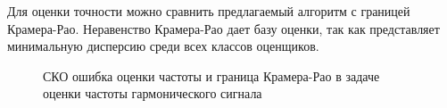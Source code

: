 Для оценки точности можно сравнить предлагаемый алгоритм с границей Крамера-Рао. Неравенство Крамера-Рао дает базу оценки, так
как представляет минимальную дисперсию среди всех классов оценщиков.
\begin{figure}[H]
\center{}
	\caption{СКО ошибка оценки частоты и граница Крамера-Рао в задаче оценки частоты гармонического сигнала}
	\label{pic:crlb_vs_1sat_algo}
\end{figure}
